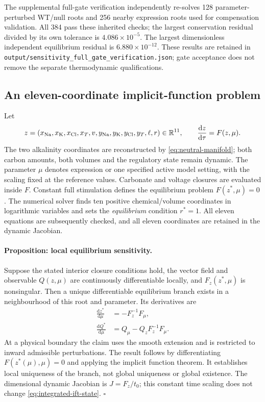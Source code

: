 The supplemental full-gate verification independently re-solves 128
parameter-perturbed WT/null roots and 256 nearby expression roots used for
compensation validation. All 384 pass these inherited checks; the largest
conservation residual divided by its own tolerance is $4.086\times10^{-5}$.
The largest dimensionless independent equilibrium residual is
$6.880\times10^{-12}$. These results are retained in
\texttt{output/sensitivity\_full\_gate\_verification.json}; gate acceptance
does not remove the separate thermodynamic qualifications.

\subsection{An eleven-coordinate implicit-function problem}
Let
\[
 z=(x_{\rm Na},x_{\rm K},x_{\rm Cl},x_T,v,
       y_{\rm Na},y_{\rm K},y_{\rm Cl},y_T,\ell,r)\in\mathbb R^{11},
 \qquad \frac{\mathrm dz}{\mathrm d\tau}=F(z,\mu).
\]
The two alkalinity coordinates are reconstructed by
\eqref{eq:neutral-manifold}; both carbon amounts, both volumes and the
regulatory state remain dynamic. The parameter $\mu$ denotes expression
or one specified active model setting, with the scaling fixed at the
reference values. Carbonate and voltage closures are evaluated inside $F$.
Constant full stimulation defines the equilibrium problem $F(z^*,\mu)=0$.
The numerical solver finds ten positive chemical/volume coordinates in
logarithmic variables and sets the \emph{equilibrium} condition $r^*=1$.
All eleven equations are subsequently checked, and all eleven coordinates
are retained in the dynamic Jacobian.

\paragraph{Proposition: local equilibrium sensitivity.}
Suppose the stated interior closure conditions hold, the vector field and
observable $Q(z,\mu)$ are continuously differentiable locally, and
$F_z(z^*,\mu)$ is nonsingular. Then a unique differentiable equilibrium
branch exists in a neighbourhood of this root and parameter. Its derivatives
are
\begin{align}
 \frac{\mathrm dz^*}{\mathrm d\mu}
   &=-F_z^{-1}F_\mu,\label{eq:integrated-ift-state}\\
 \frac{\mathrm dQ^*}{\mathrm d\mu}
   &=Q_\mu-Q_zF_z^{-1}F_\mu.
   \label{eq:integrated-ift-output}
\end{align}
At a physical boundary the claim uses the smooth extension and is restricted
to inward admissible perturbations. The result follows by differentiating
$F(z^*(\mu),\mu)=0$ and applying the implicit function theorem. It establishes
local uniqueness of the branch, not global uniqueness or global existence.
The dimensional dynamic Jacobian is $J=F_z/t_0$; this constant time scaling
does not change \eqref{eq:integrated-ift-state}. $\square$

